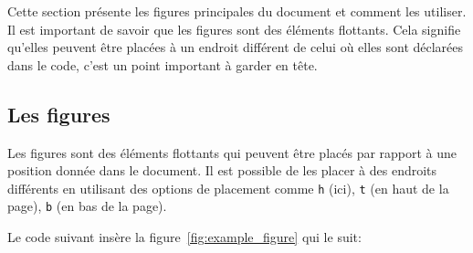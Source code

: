 Cette section présente les figures principales du document
et comment les utiliser. Il est important de savoir que
les figures sont des éléments flottants. Cela signifie 
qu'elles peuvent être placées à un endroit différent
de celui où elles sont déclarées dans le code, c'est un 
point important à garder en tête.

\subsection{Les figures}\label{subsec:latex_figures}
Les figures sont des éléments flottants qui peuvent être placés
par rapport à une position donnée dans le document. Il est possible
de les placer à des endroits différents en utilisant des options de placement
comme \texttt{h} (ici), \texttt{t} (en haut de la page), \texttt{b} (en bas de la page).

Le code suivant insère la figure~\ref{fig:example_figure} qui le suit:

\inputminted[frame=single,framesep=4pt,breaklines,linenos]{latex}{./5_Figures/figure1_code.tex}

